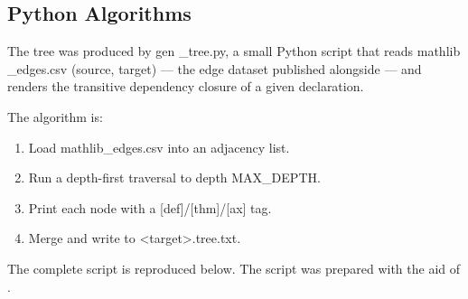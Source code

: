 \documentclass[11pt,reqno]{amsart}
\begin{document}
\subsection{Python Algorithms}

\label{sec:python}

\noindent {}The tree was produced by \textsf{gen\allowbreak
\_tree.py}, a small Python script that reads \textsf{mathlib\allowbreak
\_edges.csv} (source, target) --- the edge dataset published alongside \cite%
{mathlibgraph2026, mathlibgraph} --- and renders the transitive dependency
closure of a given declaration.

\noindent The algorithm is:

\begin{enumerate}
\item Load \textsf{mathlib\allowbreak\_edges.csv} into an adjacency list.

\item Run a depth-first traversal to depth \textsf{MAX\allowbreak\_DEPTH}.

\item Print each node with a \textsf{[def]}/\textsf{[thm]}/\textsf{[ax]} tag.

\item Merge and write to \textsf{<target>.tree.txt}.
\end{enumerate}

\noindent The complete script is reproduced below. The script was prepared
with the aid of \cite{deepseek-chat}.
\end{document}
